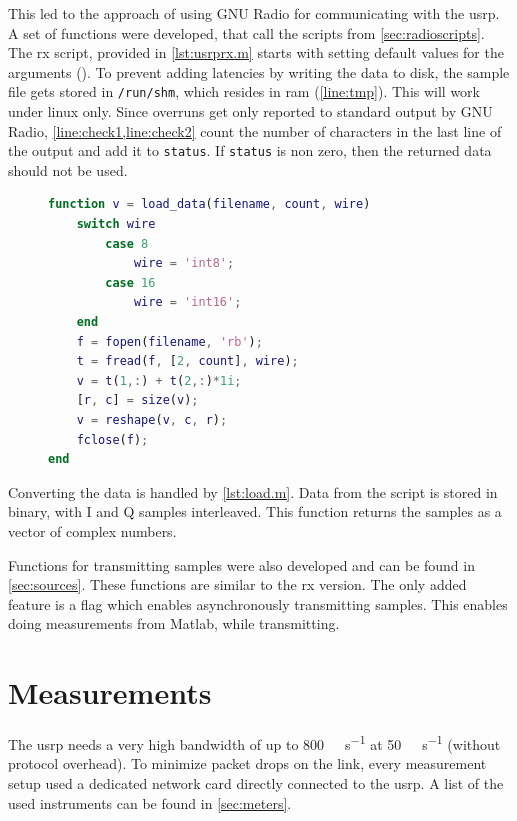 \documentclass[12pt,a4paper,parskip=full,abstracton]{scrartcl}
\begin{document}
This led to the approach of using GNU Radio for communicating with the \gls{usrp}. A
set of functions were developed, that call the scripts from \cref{sec:radioscripts}.
The \gls{rx} script, provided in \cref{lst:usrprx.m} starts with setting
default values for the arguments (). To prevent
adding latencies by writing the data to disk, the sample file gets stored in
\texttt{/run/shm}, which resides in \gls{ram} (\cref{line:tmp}). This will
work under linux only. Since overruns get only reported to standard output by
GNU Radio, \cref{line:check1,line:check2} count the number of characters in
the last line of the output and add it to \texttt{status}. If \texttt{status}
is non zero, then the returned data should not be used.

\begin{figure}[htb]
    \centering
    \begin{lstlisting}[language=matlab,basicstyle=\tiny,caption={Matlab function for loading data exported by GNU Radio ({\ttfamily load\_data.m)}},label=lst:load.m]
function v = load_data(filename, count, wire)
    switch wire
        case 8
            wire = 'int8';
        case 16
            wire = 'int16';
    end
    f = fopen(filename, 'rb');
    t = fread(f, [2, count], wire);
    v = t(1,:) + t(2,:)*1i;
    [r, c] = size(v);
    v = reshape(v, c, r);
    fclose(f);
end
    \end{lstlisting}
\end{figure}

Converting the data is handled by \cref{lst:load.m}. Data from the script is
stored in binary, with I and Q samples interleaved. This function returns the
samples as a vector of complex numbers.

Functions for transmitting samples were also developed and can be found in
\cref{sec:sources}. These functions are similar to the \gls{rx} version. The
only added feature is a flag which enables asynchronously transmitting samples. This
enables doing measurements from Matlab, while transmitting.

\clearpage
\section{Measurements}
\label{sec:measurements}
The \gls{usrp} needs a very high bandwidth of up to \SI{800}{\mega\bit\per\second} at \SI{50}{\mega\samples\per\second}
(without protocol overhead). To minimize packet drops on the link, every measurement setup
used a dedicated network card directly connected to the \gls{usrp}.
A list of the used instruments can be found in \cref{sec:meters}.
\end{document}
